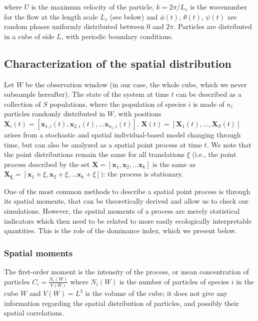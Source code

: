 \documentclass[english]{article}
\begin{document}
where $U$ is the maximum velocity of the particle, $k=2\pi/L_{s}$
is the wavenumber for the flow at the length scale $L_{s}$ (see below)
and $\phi(t)$, $\theta(t)$, $\psi(t)$ are random phases uniformly
distributed between $0$ and $2\pi$. Particles are distributed in
a cube of side $L$, with periodic boundary conditions.

\subsection*{Characterization of the spatial distribution}

Let $W$ be the observation window (in our case, the whole cube, which
we never subsample hereafter). The state of the system at time $t$
can be described as a collection of $S$ populations, where the population
of species $i$ is made of $n_{i}$ particles randomly distributed
in $W$, with positions $\boldsymbol{X}_{i}(t)=[\boldsymbol{x}_{1,i}(t),\boldsymbol{x}_{2,i}(t),...\boldsymbol{x}_{n_{i},i}(t)]$.
$\boldsymbol{X}(t)=[\boldsymbol{X}_{1}(t),\ldots,\boldsymbol{X}_{S}(t)]$
arises from a stochastic and spatial individual-based model changing
through time, but can also be analyzed as a spatial point process
at time $t$. We note that the point distributions remain the same
for all translations $\xi$ (i.e., the point process described by
the set $\boldsymbol{X}=[\boldsymbol{x}_{1},\boldsymbol{x}_{2},...\boldsymbol{x}_{k}]$
is the same as $\boldsymbol{X_{\xi}}=[\boldsymbol{x}_{1}+\xi,\boldsymbol{x}_{2}+\xi,...\boldsymbol{x}_{k}+\xi])$:
the process is stationary.

One of the most common methods to describe a spatial point process
is through its spatial moments, that can be theoretically derived
and allow us to check our simulations. However, the spatial moments
of a process are merely statistical indicators which then need to
be related to more easily ecologically interpretable quantities. This
is the role of the dominance index, which we present below.

\subsubsection*{Spatial moments}

The first-order moment is the intensity of the process, or mean concentration
of particles $C_{i}=\frac{N_{i}(W)}{V(W)}$ where $N_{i}(W)$ is the
number of particles of species $i$ in the cube $W$ and $V(W)=L^{3}$
is the volume of the cube; it does not give any information regarding
the spatial distribution of particles, and possibly their spatial
correlations.
\end{document}

